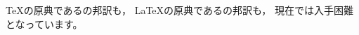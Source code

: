 \documentclass[uplatex]{jsarticle}
\begin{document}
\TeX の原典である\cite{jtexbook}の邦訳も，
\LaTeX の原典である\cite{jlatexbook}の邦訳も，
現在では入手困難となっています。

\printbibliography[title=参考文献]
\end{document}
